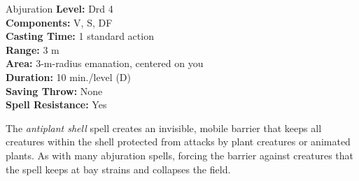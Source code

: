 {Abjuration}
{
	\textbf{Level:}
	Drd 4\\
	\textbf{Components:}
	V, S, DF\\
	\textbf{Casting Time:}
	1 standard action\\
	\textbf{Range:}
	3 m\\
	\textbf{Area:}
	3-m-radius emanation, centered on you\\
	\textbf{Duration:}
	10 min./level (D)\\
	\textbf{Saving Throw:}
	None\\
	\textbf{Spell Resistance:}
	Yes\\
}
{
	The \emph{antiplant shell} spell creates an invisible, mobile barrier that keeps all creatures within the shell protected from attacks by plant creatures or animated plants. As with many abjuration spells, forcing the barrier against creatures that the spell keeps at bay strains and collapses the field.

}
